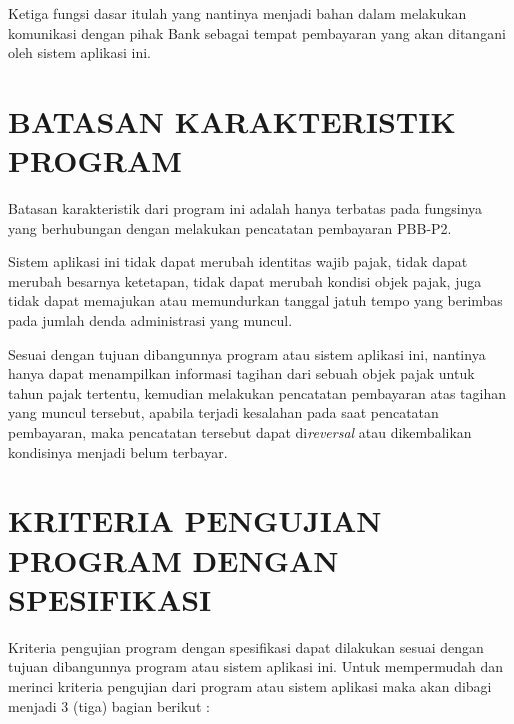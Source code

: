 \documentclass[pdftex,12pt, oneside]{article}
\begin{document}
Ketiga fungsi dasar itulah yang nantinya menjadi bahan dalam melakukan komunikasi dengan pihak Bank sebagai tempat pembayaran yang akan ditangani oleh sistem aplikasi ini.

\section{BATASAN KARAKTERISTIK PROGRAM}

Batasan karakteristik dari program ini adalah hanya terbatas pada fungsinya yang berhubungan dengan melakukan pencatatan pembayaran PBB-P2.

Sistem aplikasi ini tidak dapat merubah identitas wajib pajak, tidak dapat merubah besarnya ketetapan, tidak dapat merubah kondisi objek pajak, juga tidak dapat memajukan atau memundurkan tanggal jatuh tempo yang berimbas pada jumlah denda administrasi yang muncul.

Sesuai dengan tujuan dibangunnya program atau sistem aplikasi ini, nantinya hanya dapat menampilkan informasi tagihan dari sebuah objek pajak untuk tahun pajak tertentu, kemudian melakukan pencatatan pembayaran atas tagihan yang muncul tersebut, apabila terjadi kesalahan pada saat pencatatan pembayaran, maka pencatatan tersebut dapat di\textit{reversal} atau dikembalikan kondisinya menjadi belum terbayar.

\section{KRITERIA PENGUJIAN PROGRAM DENGAN SPESIFIKASI}

Kriteria pengujian program dengan spesifikasi dapat dilakukan sesuai dengan tujuan dibangunnya program atau sistem aplikasi ini. Untuk mempermudah dan merinci kriteria pengujian dari program atau sistem aplikasi maka akan dibagi menjadi 3 (tiga) bagian berikut :
\end{document}
